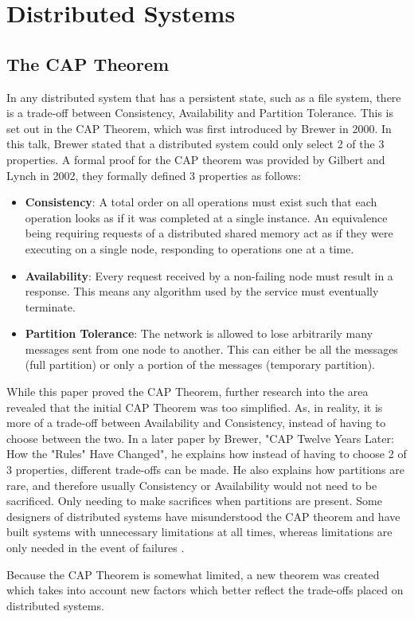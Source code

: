 \documentclass[12pt]{report}
\begin{document}
\section{Distributed Systems}
\subsection{The CAP Theorem}
In any distributed system that has a persistent state, such as a file system, there is a trade-off between Consistency, Availability and Partition Tolerance.
This is set out in the CAP Theorem, which was first introduced by Brewer in 2000\cite{CAPTheorem}. In this talk, Brewer stated that a distributed system could only select 2 of the 3 properties. A formal proof for the CAP theorem was provided by Gilbert and Lynch in 2002\cite{10.1145/564585.564601}, they formally defined 3 properties as follows:
\begin{itemize}
    \item \textbf{Consistency}: A total order on all operations must exist such that each operation looks as if it was completed at a single instance. An equivalence being requiring requests of a distributed shared memory act as if they were executing on a single node, responding to operations one at a time.
    \item \textbf{Availability}: Every request received by a non-failing node must result in a response.  This means any algorithm used by the service must eventually terminate.
    \item \textbf{Partition Tolerance}: The network is allowed to lose arbitrarily many messages sent from one node to another. This can either be all the messages (full partition) or only a portion of the messages (temporary partition).
\end{itemize}
While this paper proved the CAP Theorem, further research into the area revealed that the initial CAP Theorem was too simplified. As, in reality, it is more of a trade-off between Availability and Consistency, instead of having to choose between the two. In a later paper by Brewer, "CAP Twelve Years Later: How the "Rules" Have Changed"\cite{6133253}, he explains how instead of having to choose 2 of 3 properties, different trade-offs can be made. He also explains how partitions are rare, and therefore usually Consistency or Availability would not need to be sacrificed. Only needing to make sacrifices when partitions are present. Some designers of distributed systems have misunderstood the CAP theorem and have built systems with unnecessary limitations at all times, whereas limitations are only needed in the event of failures \cite{6133253}. \par
Because the CAP Theorem is somewhat limited, a new theorem was created which takes into account new factors which better reflect the trade-offs placed on distributed systems.
\end{document}
